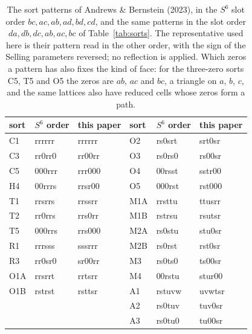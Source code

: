 \documentclass[preprint,pdf]{iucr}          %
\begin{document}
\begin{table}
\caption{The sort patterns of Andrews \& Bernstein (2023), in the $S^6$ slot order $bc,ac,ab,ad,bd,cd$, and the same patterns in the slot order $da,db,dc,ab,ac,bc$ of Table~\ref{tab:sorts}. The representative used here is their pattern read in the other order, with the sign of the Selling parameters reversed; no reflection is applied. Which zeros a pattern has also fixes the kind of face: for the three-zero sorts C5, T5 and O5 the zeros are $ab$, $ac$ and $bc$, a triangle on $a$, $b$, $c$, and the same lattices also have reduced cells whose zeros form a path.}
\label{tab:corr}
\begin{footnotesize}
\begin{tabular}{lll@{\hspace{2em}}lll}
\toprule
sort & $S^6$ order & this paper & sort & $S^6$ order & this paper \\
\midrule
C1 & rrrrrr & rrrrrr & O2 & rs0srt & srt0sr \\
C3 & rr0rr0 & rr00rr & O3 & rs0rs0 & rs00sr \\
C5 & 000rrr & rrr000 & O4 & 00rsst & sstr00 \\
H4 & 00rrrs & rrsr00 & O5 & 000rst & rst000 \\
T1 & rrsrrs & rrssrr & M1A & rrsttu & ttusrr \\
T2 & rr0rrs & rrs0rr & M1B & rstrsu & rsutsr \\
T5 & 000rrs & rrs000 & M2A & rs0stu & stu0sr \\
R1 & rrrsss & sssrrr & M2B & rs0rst & rst0sr \\
R3 & rr0sr0 & sr00rr & M3 & rs0ts0 & ts00sr \\
O1A & rrsrrt & rrtsrr & M4 & 00rstu & stur00 \\
O1B & rstrst & rsttsr & A1 & rstuvw & uvwtsr \\
 & & & A2 & rs0tuv & tuv0sr \\
 & & & A3 & rs0tu0 & tu00sr \\
\bottomrule
\end{tabular}
\end{footnotesize}
\end{table}
\end{document}
